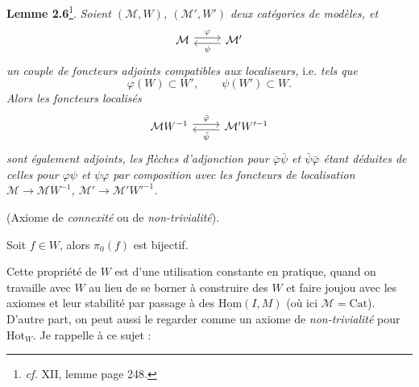 \documentclass[11pt]{article}
\newcommand{\msp}[1]{\marginpar{\footnotesize [#1]}}
\begin{document}
\textbf{Lemme 2.6}\footnote{\textit{cf.} XII, lemme page 248.}. \textit{Soient $(\mathcal{M}, W)$, $(\mathcal{M}', W')$ deux catégories de modèles, et}
\[
\begin{tikzcd}
\mathcal{M} \arrow[r, shift left, "\varphi"] & \mathcal{M}' \arrow[l, shift left, "\psi"]
\end{tikzcd}
\]
\textit{un couple de foncteurs adjoints compatibles aux localiseurs,} i.e. \textit{tels que}
\[
\varphi(W) \subset W', \qquad \psi(W') \subset W.
\]
\textit{Alors les foncteurs localisés}
\[
\begin{tikzcd}
\mathcal{M}W^{-1} \arrow[r, shift left, "\bar{\varphi}"] & \mathcal{M}'W'^{-1} \arrow[l, shift left, "\bar{\psi}"]
\end{tikzcd}
\]
\textit{sont également adjoints, les flèches d'adjonction pour $\bar{\varphi}\bar{\psi}$ et $\bar{\psi}\bar{\varphi}$ étant déduites de celles pour $\varphi\psi$ et $\psi\varphi$ par composition avec les foncteurs de localisation $\mathcal{M} \longrightarrow \mathcal{M}W^{-1}$, $\mathcal{M}' \longrightarrow \mathcal{M}'W'^{-1}$.}

\begin{description}[leftmargin=7em, labelwidth=6em]
\item[Loc (5)] \msp{page 12}(Axiome de \textit{connexité} ou de \textit{non-trivialité}).

Soit $f \in W$, alors $\pi_0(f)$ est bijectif.
\end{description}

Cette propriété de $W$ est d'une utilisation constante en pratique, quand on travaille avec $W$ au lieu de se borner à construire des $W$ et faire joujou avec les axiomes et leur stabilité par passage à des $\underline{\mathrm{Hom}}(I, M)$ (où ici $\mathcal{M} = \mathrm{Cat}$). D'autre part, on peut aussi le regarder comme un axiome de \textit{non-trivialité} pour $\mathrm{Hot}_W$. Je rappelle à ce sujet :
\end{document}
